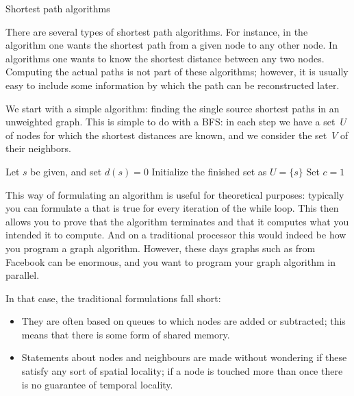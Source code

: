  {Shortest path algorithms}
\label{sec:sssp}

There are several types of shortest path algorithms. For instance,
in the  algorithm
one wants the shortest path from a given node to any other node.
In  algorithms
one wants to know the shortest distance between any two nodes.
Computing the actual paths is not part of these algorithms; 
however, it is usually easy to include some information by
which the path can be reconstructed later.

We start with a simple algorithm: finding the single source shortest
paths in an unweighted graph. This is simple to do with a \acf{BFS}:
in each step we have a set~$U$ of nodes for which the shortest distances
are known, and we consider the set~$V$ of their neighbors.

\begin{displayalgorithm}
  Let $s$ be given, and set $d(s)=0$\;
  Initialize the finished set as $U=\{s\}$\;
  Set $c=1$\;
\end{displayalgorithm}

This way of formulating an algorithm is useful for theoretical purposes:
typically you can formulate a  that is true
for every iteration of the while loop. This then allows you to prove
that the algorithm terminates and that it computes what you intended it to compute.
And on a traditional processor this would indeed be how you program 
a graph algorithm. However, these days graphs such as from Facebook 
can be enormous, and you want to program your graph algorithm in
parallel.

In that case, the traditional formulations fall short:
\begin{itemize}
\item They are often based on queues to which nodes are added or subtracted; this means
  that there is some form of shared memory.
\item Statements about nodes and neighbours are made without wondering if these
  satisfy any sort of spatial locality; if a node is touched more than once there is
  no guarantee of temporal locality.
\end{itemize}

